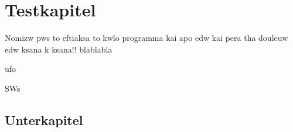 




\chapter{Testkapitel}
Nomizw pws to eftiaksa to kwlo programma kai apo edw kai pera tha douleuw edw ksana k ksana!!
\newpage
blablabla
\cite{DieterGerling.2014}

\ac{ufo}

\acp{SW}


\section{Unterkapitel}

